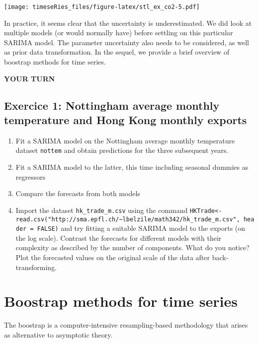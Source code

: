 \documentclass[]{book}
\providecommand{\tightlist}{%
  \setlength{\itemsep}{0pt}\setlength{\parskip}{0pt}}
\begin{document}
\texttt{[image: timeseRies\_files/figure-latex/stl\_ex\_co2-5.pdf]}

In practice, it seems clear that the uncertainty is underestimated. We
did look at multiple models (or would normally have) before settling on
this particular SARIMA model. The parameter uncertainty also needs to be
considered, as well as prior data transformation. In the sequel, we
provide a brief overview of boostrap methods for time series.

\textbf{YOUR TURN}

\subsection{Exercice 1: Nottingham average monthly temperature and Hong
Kong monthly
exports}\label{exercice-1-nottingham-average-monthly-temperature-and-hong-kong-monthly-exports}

\begin{enumerate}
\def\labelenumi{\arabic{enumi}.}
\tightlist
\item
  Fit a SARIMA model on the Nottingham average monthly temperature
  dataset \texttt{nottem} and obtain predictions for the three
  subsequent years.
\item
  Fit a SARIMA model to the latter, this time including seasonal dummies
  as regressors
\item
  Compare the forecasts from both models
\item
  Import the dataset \texttt{hk\_trade\_m.csv} using the command
  \texttt{HKTrade\textless{}-read.csv("http://sma.epfl.ch/\textasciitilde{}lbelzile/math342/hk\_trade\_m.csv",\ header\ =\ FALSE)}
  and try fitting a suitable SARIMA model to the exports (on the log
  scale). Contrast the forecasts for different models with their
  complexity as described by the number of components. What do you
  notice? Plot the forecasted values on the original scale of the data
  after back-transforming.
\end{enumerate}

\section{Boostrap methods for time
series}\label{boostrap-methods-for-time-series}

The boostrap is a computer-intensive resampling-based methodology that
arises as alternative to asymptotic theory.
\end{document}
